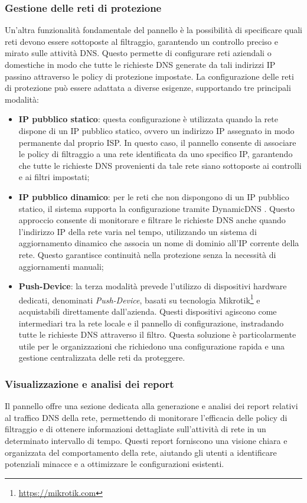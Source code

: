 \subsubsection{Gestione delle reti di protezione}
Un'altra funzionalità fondamentale del pannello è la possibilità di specificare quali reti devono essere sottoposte al filtraggio, garantendo un controllo preciso e mirato sulle attività DNS. Questo permette di configurare reti aziendali o domestiche in modo che tutte le richieste DNS generate da tali indirizzi IP passino attraverso le policy di protezione impostate. La configurazione delle reti di protezione può essere adattata a diverse esigenze, supportando tre principali modalità:
\begin{itemize}
  \item \textbf{IP pubblico statico}: questa configurazione è utilizzata quando la rete dispone di un IP pubblico statico, ovvero un indirizzo IP assegnato in modo permanente dal proprio ISP. In questo caso, il pannello consente di associare le policy di filtraggio a una rete identificata da uno specifico IP, garantendo che tutte le richieste DNS provenienti da tale rete siano sottoposte ai controlli e ai filtri impostati;

  \item \textbf{IP pubblico dinamico}: per le reti che non dispongono di un IP pubblico statico, il sistema supporta la configurazione tramite DynamicDNS \cite{rfc2136}. Questo approccio consente di monitorare e filtrare le richieste DNS anche quando l’indirizzo IP della rete varia nel tempo, utilizzando un sistema di aggiornamento dinamico che associa un nome di dominio all’IP corrente della rete. Questo garantisce continuità nella protezione senza la necessità di aggiornamenti manuali;

  \item \textbf{Push-Device}: la terza modalità prevede l’utilizzo di dispositivi hardware dedicati, denominati \textit{Push-Device}, basati su tecnologia Mikrotik\footnote{\url{https://mikrotik.com}} e acquistabili direttamente dall’azienda. Questi dispositivi agiscono come intermediari tra la rete locale e il pannello di configurazione, instradando tutte le richieste DNS attraverso il filtro. Questa soluzione è particolarmente utile per le organizzazioni che richiedono una configurazione rapida e una gestione centralizzata delle reti da proteggere.
\end{itemize}

\subsubsection{Visualizzazione e analisi dei report}
Il pannello offre una sezione dedicata alla generazione e analisi dei report relativi al traffico DNS della rete, permettendo di monitorare l’efficacia delle policy di filtraggio e di ottenere informazioni dettagliate sull’attività di rete in un determinato intervallo di tempo. Questi report forniscono una visione chiara e organizzata del comportamento della rete, aiutando gli utenti a identificare potenziali minacce e a ottimizzare le configurazioni esistenti.

